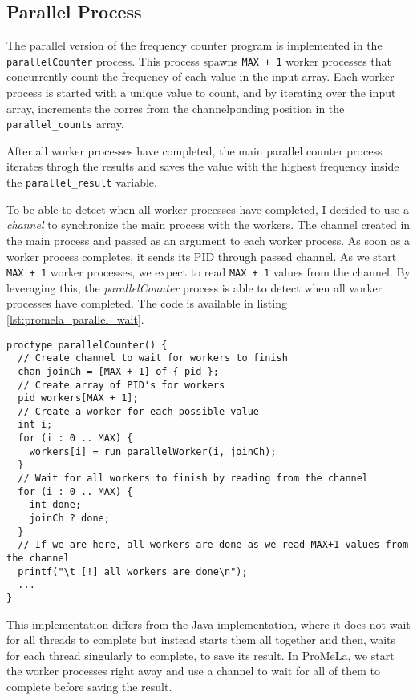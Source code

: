 \documentclass[a4paper, 11pt]{article}
\begin{document}
\subsection{Parallel Process}
\label{sec:parallel_process}

The parallel version of the frequency counter program is implemented in the \texttt{parallelCounter} process. This process spawns \texttt{MAX + 1} worker processes that concurrently count the frequency of each value in the input array. Each worker process is started with a unique value to count, and by iterating over the input array, increments the corres from the channelponding position in the \texttt{parallel\_counts} array.

After all worker processes have completed, the main parallel counter process iterates throgh the results and saves the value with the highest frequency inside the \texttt{parallel\_result} variable.

To be able to detect when all worker processes have completed, I decided to use a \textit{channel} to synchronize the main process with the workers. The channel created in the main process and passed as an argument to each worker process. As soon as a worker process completes, it sends its PID through passed channel. As we start \texttt{MAX + 1} worker processes, we expect to read \texttt{MAX + 1} values from the channel. By leveraging this, the \textit{parallelCounter} process is able to detect when all worker processes have completed. The code is available in listing \ref{lst:promela_parallel_wait}.

\begin{lstlisting}[language=Promela, caption={ProMeLa parallel frequency counter - worker synchronization with channel}, label={lst:promela_parallel_wait}]
proctype parallelCounter() {
  // Create channel to wait for workers to finish
  chan joinCh = [MAX + 1] of { pid };
  // Create array of PID's for workers
  pid workers[MAX + 1];
  // Create a worker for each possible value
  int i;
  for (i : 0 .. MAX) {
    workers[i] = run parallelWorker(i, joinCh);
  }
  // Wait for all workers to finish by reading from the channel
  for (i : 0 .. MAX) {
    int done;
    joinCh ? done;
  }
  // If we are here, all workers are done as we read MAX+1 values from the channel
  printf("\t [!] all workers are done\n");
  ...
}
\end{lstlisting}

\noindent This implementation differs from the Java implementation, where it does not wait for all threads to complete but instead starts them all together and then, waits for each thread singularly to complete, to save its result. In ProMeLa, we start the worker processes right away and use a channel to wait for all of them to complete before saving the result.
\end{document}
